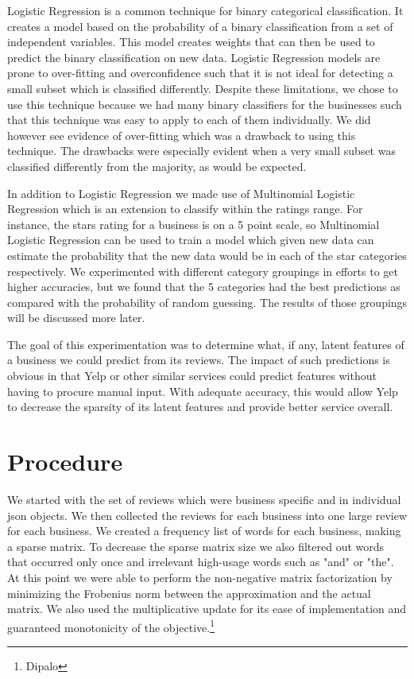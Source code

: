 \documentclass{article}
\begin{document}
Logistic Regression is a common technique for binary categorical classification.  It creates a model based on the probability of a binary classification from a set of independent variables.  This model creates weights that can then be used to predict the binary classification on new data.  Logistic Regression models are prone to over-fitting and overconfidence such that it is not ideal for detecting a small subset which is classified differently.  Despite these limitations, we chose to use this technique because we had many binary classifiers for the businesses such that this technique was easy to apply to each of them individually.  We did however see evidence of over-fitting which was a drawback to using this technique.  The drawbacks were especially evident when a very small subset was classified differently from the majority, as would be expected.

In addition to Logistic Regression we made use of Multinomial Logistic Regression which is an extension to classify within the ratings range.  For instance, the stars rating for a business is on a 5 point scale, so Multinomial Logistic Regression can be used to train a model which given new data can estimate the probability that the new data would be in each of the star categories respectively.  We experimented with different category groupings in efforts to get higher accuracies, but we found that the 5 categories had the best predictions as compared with the probability of random guessing.  The results of those groupings will be discussed more later.

The goal of this experimentation was to determine what, if any, latent features of a business we could predict from its reviews.  The impact of such predictions is obvious in that Yelp or other similar services could predict features without having to procure manual input.  With adequate accuracy, this would allow Yelp to decrease the sparsity of its latent features and provide better service overall.

\section{Procedure}
We started with the set of reviews which were business specific and in individual json objects.  We then collected the reviews for each business into one large review for each business.  We created a frequency list of words for each business, making a sparse matrix.  To decrease the sparse matrix size we also filtered out words that occurred only once and irrelevant high-usage words such as "and" or "the".  At this point we were able to perform the non-negative matrix factorization by minimizing the Frobenius norm between the approximation and the actual matrix.  We also used the multiplicative update for its ease of implementation and guaranteed monotonicity of the objective.\footnote{Dipalo} 
\end{document}
